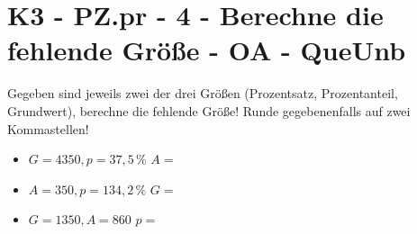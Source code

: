 \section{K3 - PZ.pr - 4 - Berechne die fehlende Größe - OA - QueUnb}

\begin{beispiel}{0} %
				Gegeben sind jeweils zwei der drei Größen (Prozentsatz, Prozentanteil, Grundwert), berechne die fehlende Größe! Runde gegebenenfalls auf zwei Kommastellen!
				
				\begin{itemize}
					\item $G=4350, p=37,5\,\%$ \hspace{1,5cm}$A=$ \leer
					
					\item $A=350, p=134,2\,\%$ \hspace{1,5cm}$G=$ \leer
					
					\item $G=1350, A=860$ \hspace{2cm}$p=$ 
				\end{itemize}
\end{beispiel}